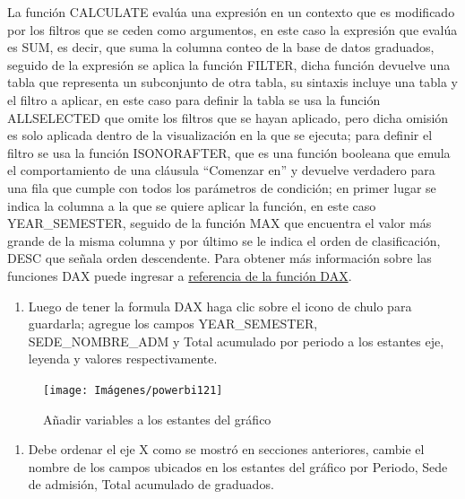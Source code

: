 \documentclass[
]{book}
\providecommand{\tightlist}{%
  \setlength{\itemsep}{0pt}\setlength{\parskip}{0pt}}
\begin{document}
La función CALCULATE evalúa una expresión en un contexto que es modificado por los filtros que se ceden como argumentos, en este caso la expresión que evalúa es SUM, es decir, que suma la columna conteo de la base de datos graduados, seguido de la expresión se aplica la función FILTER, dicha función devuelve una tabla que representa un subconjunto de otra tabla, su sintaxis incluye una tabla y el filtro a aplicar, en este caso para definir la tabla se usa la función ALLSELECTED que omite los filtros que se hayan aplicado, pero dicha omisión es solo aplicada dentro de la visualización en la que se ejecuta; para definir el filtro se usa la función ISONORAFTER, que es una función booleana que emula el comportamiento de una cláusula ``Comenzar en'' y devuelve verdadero para una fila que cumple con todos los parámetros de condición; en primer lugar se indica la columna a la que se quiere aplicar la función, en este caso YEAR\_SEMESTER, seguido de la función MAX que encuentra el valor más grande de la misma columna y por último se le indica el orden de clasificación, DESC que señala orden descendente. Para obtener más información sobre las funciones DAX puede ingresar a \href{https://docs.microsoft.com/en-us/dax/}{referencia de la función DAX}.

\begin{enumerate}
\def\labelenumi{\arabic{enumi}.}
\setcounter{enumi}{3}
\tightlist
\item
  Luego de tener la formula DAX haga clic sobre el icono de chulo para guardarla; agregue los campos YEAR\_SEMESTER, SEDE\_NOMBRE\_ADM y Total acumulado por periodo a los estantes eje, leyenda y valores respectivamente.
\end{enumerate}

\begin{figure}

{\centering \texttt{[image: Imágenes/powerbi121]} 

}

\caption{Añadir variables a los estantes del gráfico}\label{fig:paso4graficoareas-fig}
\end{figure}

\begin{enumerate}
\def\labelenumi{\arabic{enumi}.}
\setcounter{enumi}{4}
\tightlist
\item
  Debe ordenar el eje X como se mostró en secciones anteriores, cambie el nombre de los campos ubicados en los estantes del gráfico por Periodo, Sede de admisión, Total acumulado de graduados.
\end{enumerate}
\end{document}
